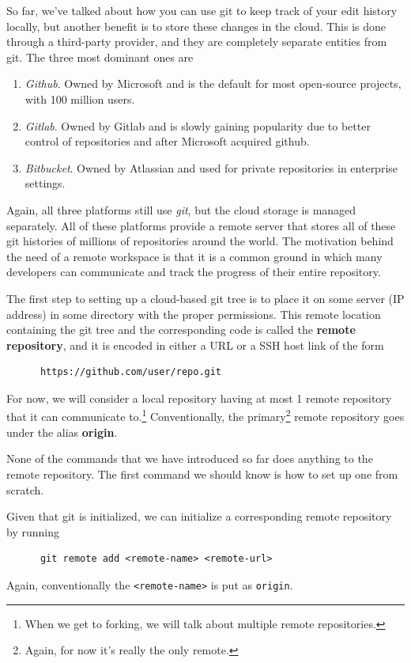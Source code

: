   So far, we've talked about how you can use git to keep track of your edit history locally, but another benefit is to store these changes in the cloud. This is done through a third-party provider, and they are completely separate entities from git. The three most dominant ones are  
  \begin{enumerate}
    \item \textit{Github}. Owned by Microsoft and is the default for most open-source projects, with 100 million users. 
    \item \textit{Gitlab}. Owned by Gitlab and is slowly gaining popularity due to better control of repositories and after Microsoft acquired github. 
    \item \textit{Bitbucket}. Owned by Atlassian and used for private repositories in enterprise settings. 
  \end{enumerate}
  Again, all three platforms still use \textit{git}, but the cloud storage is managed separately. All of these platforms provide a remote server that stores all of these git histories of millions of repositories around the world. The motivation behind the need of a remote workspace is that it is a common ground in which many developers can communicate and track the progress of their entire repository. 

  \begin{definition}
    The first step to setting up a cloud-based git tree is to place it on some server (IP address) in some directory with the proper permissions. This remote location containing the git tree and the corresponding code is called the \textbf{remote repository}, and it is encoded in either a URL or a SSH host link of the form 
    \begin{lstlisting}
      https://github.com/user/repo.git
    \end{lstlisting} 
    For now, we will consider a local repository having at most 1 remote repository that it can communicate to.\footnote{When we get to forking, we will talk about multiple remote repositories.} Conventionally, the primary\footnote{Again, for now it's really the only remote.} remote repository goes under the alias \textbf{origin}. 
  \end{definition}  

  None of the commands that we have introduced so far does anything to the remote repository. The first command we should know is how to set up one from scratch. 

  \begin{definition}
    Given that git is initialized, we can initialize a corresponding remote repository by running 
    \begin{lstlisting}
      git remote add <remote-name> <remote-url>
    \end{lstlisting}
    Again, conventionally the \texttt{<remote-name>} is put as \texttt{origin}. 
  \end{definition} 

